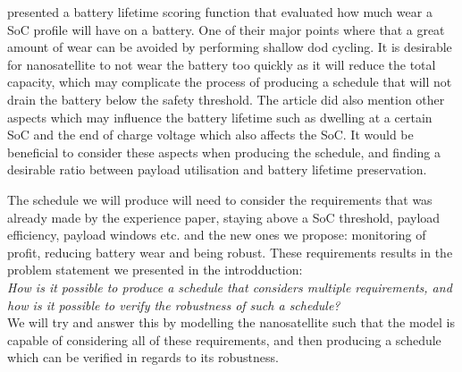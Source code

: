 \cite{score_function} presented a battery lifetime scoring function that evaluated how much wear a SoC profile will have on a battery. One of their major points where that a great amount of wear can be avoided by performing shallow \gls{dod} cycling. It is desirable for nanosatellite to not wear the battery too quickly as it will reduce the total capacity, which may complicate the process of producing a schedule that will not drain the battery below the safety threshold. The article did also mention other aspects which may influence the battery lifetime such as dwelling at a certain SoC and the end of charge voltage which also affects the SoC. It would be beneficial to consider these aspects when producing the schedule, and finding a desirable ratio between payload utilisation and battery lifetime preservation.

The schedule we will produce will need to consider the requirements that was already made by the experience paper, staying above a SoC threshold, payload efficiency, payload windows etc. and the new ones we propose: monitoring of profit, reducing battery wear and being robust. These requirements results in the problem statement we presented in the introdduction:\\
\textit{How is it possible to produce a schedule that considers multiple requirements, and how is it possible to verify the robustness of such a schedule?}\\
We will try and answer this by modelling the nanosatellite such that the model is capable of considering all of these requirements, and then producing a schedule which can be verified in regards to its robustness.